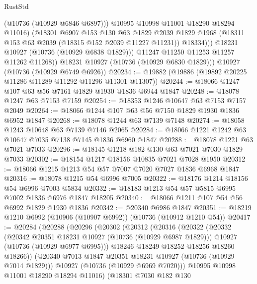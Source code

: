 \begin{lexlean}{RustStd}
\begin{coremodule}
                    (@10736 (@10929 @6846 @6897)))
                  @10995
                  @10998
                  @11001
                  @18290
                  @18294
                  @11016)
                (@18301
                  @6907
                  @153
                  @130
                  @63
                  @1829
                  @2039
                  @1829
                  @1968
                  (@18311 @153 @63 @2039 (@18315 @152 @2039 @11227 @11231))
                  @18334)))
            @18231
            @10927
            (@10736 (@10929 @6838 @1829)))
          @11247
          @11250
          @11253
          @11257
          @11262
          @11268))
      @18231
      @10927
      (@10736 (@10929 @6830 @1829)))
    @10927
    (@10736 (@10929 @6749 @6926))
@20234 := @19882 (@19886 (@19892 @20225 @11286 @11289 @11292 @11296 @11301 @11307))
@20244 := @18066 @1247 @107 @63 @56 @7161 @1829 @1930 @1836 @6944 @1847
@20248 := @18078 @1247 @63 @7153 @7159
@20254 := @18353 @1246 @10647 @63 @7153 @7157 @2049
@20264 := @18066 @1244 @107 @63 @56 @7150 @1829 @1930 @1836 @6952 @1847
@20268 := @18078 @1244 @63 @7139 @7148
@20274 := @18058 @1243 @10648 @63 @7139 @7146 @2065
@20284 := @18066 @1221 @1242 @63 @10647 @7035 @7138 @7145 @1836 @6960 @1847
@20288 := @18078 @1221 @63 @7021 @7033
@20296 := @18145 @1218 @182 @130 @63 @7021 @7030 @1829 @7033
@20302 := @18154 @1217 @18156 @10835 @7021 @7028 @1950
@20312 := @18066 @1215 @1213 @54 @57 @7007 @7020 @7027 @1836 @6968 @1847
@20316 := @18078 @1215 @54 @6996 @7005
@20322 := @18176 @1214 @18156 @54 @6996 @7003 @5834
@20332 := @18183 @1213 @54 @57 @5815 @6995 @7002 @1836 @6976 @1847 @18205
@20340 := @18066 @1211 @107 @54 @56 @6992 @1829 @1930 @1836
@20342 := @20340 @6986 @1847
@20351 := @18219 @1210 @6992 (@10906 (@10907 @6992)) (@10736 (@10912 @1210 @54))
@20417 := @20284
    (@20288
      (@20296
        (@20302
          (@20312
            (@20316
              (@20322
                (@20332
                  (@20342 @20351 @18231 @10927 (@10736 (@10929 @6987 @1829)))
                  @10927
                  (@10736 (@10929 @6977 @6995)))
                @18246
                @18249
                @18252
                @18256
                @18260
                @18266))
            (@20340 @7013 @1847 @20351 @18231 @10927 (@10736 (@10929 @7014 @1829)))
            @10927
            (@10736 (@10929 @6969 @7020)))
          @10995
          @10998
          @11001
          @18290
          @18294
          @11016)
        (@18301
          @7030
          @182
          @130

\end{coremodule}
\end{lexlean}
